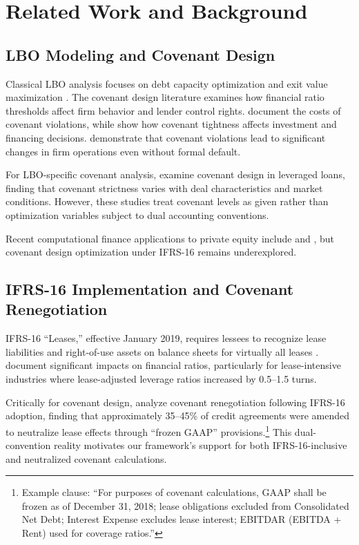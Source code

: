 \documentclass[11pt,a4paper]{article}
\numberwithin{equation}{section}
\theoremstyle{plain}
\theoremstyle{definition}
\begin{document}
\section{Related Work and Background}

\subsection{LBO Modeling and Covenant Design}

Classical LBO analysis focuses on debt capacity optimization and exit value maximization \citep{kaplan1989effects}. The covenant design literature examines how financial ratio thresholds affect firm behavior and lender control rights. \citet{dichev2002quality} document the costs of covenant violations, while \citet{chava2008default} show how covenant tightness affects investment and financing decisions. \citet{nini2009creditor} demonstrate that covenant violations lead to significant changes in firm operations even without formal default.

For LBO-specific covenant analysis, \citet{demiroglu2010lbo} examine covenant design in leveraged loans, finding that covenant strictness varies with deal characteristics and market conditions. However, these studies treat covenant levels as given rather than optimization variables subject to dual accounting conventions.

Recent computational finance applications to private equity include \citet{buchner2017simulation} and \citet{ang2018alternative}, but covenant design optimization under IFRS-16 remains underexplored.

\subsection{IFRS-16 Implementation and Covenant Renegotiation}

IFRS-16 ``Leases,'' effective January 2019, requires lessees to recognize lease liabilities and right-of-use assets on balance sheets for virtually all leases \citep{ifrs2016leases}. \citet{fito2022ifrs16} document significant impacts on financial ratios, particularly for lease-intensive industries where lease-adjusted leverage ratios increased by 0.5--1.5 turns.

Critically for covenant design, \citet{grossmann2021ifrs16} analyze covenant renegotiation following IFRS-16 adoption, finding that approximately 35--45\% of credit agreements were amended to neutralize lease effects through ``frozen GAAP'' provisions.\footnote{Example clause: ``For purposes of covenant calculations, GAAP shall be frozen as of December 31, 2018; lease obligations excluded from Consolidated Net Debt; Interest Expense excludes lease interest; EBITDAR (EBITDA + Rent) used for coverage ratios.''} This dual-convention reality motivates our framework's support for both IFRS-16-inclusive and neutralized covenant calculations.
\end{document}
